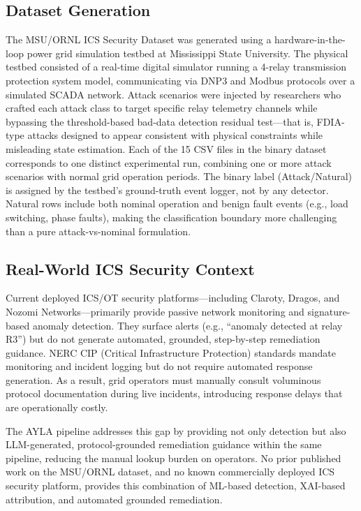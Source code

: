 \documentclass[twocolumn, 10pt, letterpaper]{article}
\begin{document}
\subsection{Dataset Generation}

The MSU/ORNL ICS Security Dataset \cite{morris2014ics} was generated using a
hardware-in-the-loop power grid simulation testbed at Mississippi State University.
The physical testbed consisted of a real-time digital simulator running a
4-relay transmission protection system model, communicating via DNP3 and Modbus
protocols over a simulated SCADA network.
Attack scenarios were injected by researchers who crafted each attack class to target
specific relay telemetry channels while bypassing the threshold-based bad-data
detection residual test---that is, FDIA-type attacks designed to appear consistent
with physical constraints while misleading state estimation.
Each of the 15 CSV files in the binary dataset corresponds to one distinct
experimental run, combining one or more attack scenarios with normal grid operation
periods.
The binary label (Attack/Natural) is assigned by the testbed's ground-truth event
logger, not by any detector.
Natural rows include both nominal operation and benign fault events (e.g., load
switching, phase faults), making the classification boundary more challenging than
a pure attack-vs-nominal formulation.

\subsection{Real-World ICS Security Context}

Current deployed ICS/OT security platforms---including Claroty, Dragos, and
Nozomi Networks---primarily provide passive network monitoring and signature-based
anomaly detection.
They surface alerts (e.g., ``anomaly detected at relay R3'') but do not generate
automated, grounded, step-by-step remediation guidance.
NERC CIP (Critical Infrastructure Protection) standards mandate monitoring and
incident logging but do not require automated response generation.
As a result, grid operators must manually consult voluminous protocol documentation
during live incidents, introducing response delays that are operationally costly.

The AYLA pipeline addresses this gap by providing not only detection but also
LLM-generated, protocol-grounded remediation guidance within the same pipeline,
reducing the manual lookup burden on operators.
No prior published work on the MSU/ORNL dataset, and no known commercially
deployed ICS security platform, provides this combination of ML-based detection,
XAI-based attribution, and automated grounded remediation.
\end{document}
